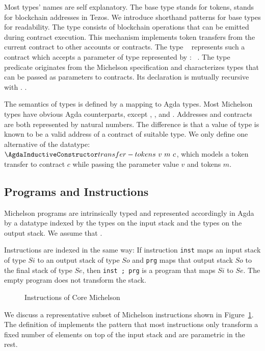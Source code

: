 Most types' names are self explanatory. The base type {\Amutez} stands
for tokens, {\Aaddr} stands for blockchain addresses in  Tezos. We introduce
shorthand patterns for base types for readability.
The type {\Aoperation} consists of blockchain operations that can
be emitted during contract execution. This mechanism implements token
transfers from the current contract to other accounts or contracts.
The type {\Acontract~\AP} represents such a contract
which accepts a parameter of type {\Aty} represented by {\AP : \APassable~\Aty}.
The type predicate {\TypesPassable} originates from the Michelson
specification and characterizes types that can be passed as parameters
to contracts. Its declaration is mutually recursive with {\AType}.
.

The semantics of types is defined by a mapping to Agda types. Most
Michelson types have  obvious Agda counterparts, except {\Aaddr},
{\Acontract}, and {\Aoperation}.  Addresses and contracts are both
represented by natural numbers. The difference is that a value of type
{\Acontract} is known to be a valid address of a contract of suitable
type. We only define one alternative of the 
{\AOperation} datatype: {$\AtransferTokens~v~m~c$}, which models a
token transfer to contract $c$ while passing the parameter value $v$
and tokens $m$.

\subsection{Programs and Instructions}
\label{sec:michelson-programs}


Michelson programs are intrinsically typed and represented accordingly in
Agda by a datatype {\AProgram} indexed by the types on the input stack
and the types on the output stack. We assume that \TypesStack.
\SyntaxProgram

Instructions are indexed in the same way:
If  instruction \verb/inst/ maps an input stack of type $Si$ to an
output stack of type $So$
and \verb/prg/ maps that output stack $So$ to the final stack of type $Se$,
then \verb/inst ; prg/ is a program that maps $Si$ to $Se$.
The empty program {\Aend} does not transform the stack.

\begin{figure}[t]
  \SyntaxInstruction  
  \caption{Instructions of Core Michelson}
  \label{fig:core-michelson-instructions}
\end{figure}
We discuss a representative subset of Michelson instructions shown in Figure~\ref{fig:core-michelson-instructions}.
The definition of {\AInstructionPlus} implements the pattern that most
instructions only transform a fixed number of elements on top of the input stack and are parametric in the rest. 

